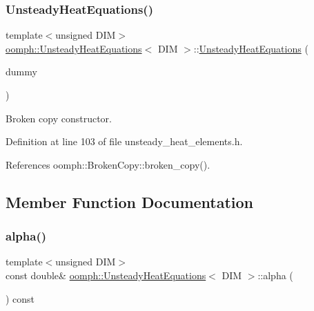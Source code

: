 \subsubsection{\texorpdfstring{Unsteady\+Heat\+Equations()}{UnsteadyHeatEquations()}\hspace{0.1cm}{\footnotesize\ttfamily [2/2]}}
{\footnotesize\ttfamily template$<$unsigned D\+IM$>$ \\
\hyperlink{classoomph_1_1UnsteadyHeatEquations}{oomph\+::\+Unsteady\+Heat\+Equations}$<$ D\+IM $>$\+::\hyperlink{classoomph_1_1UnsteadyHeatEquations}{Unsteady\+Heat\+Equations} (\begin{DoxyParamCaption}\item[{const \hyperlink{classoomph_1_1UnsteadyHeatEquations}{Unsteady\+Heat\+Equations}$<$ D\+IM $>$ \&}]{dummy }\end{DoxyParamCaption})\hspace{0.3cm}{\ttfamily [inline]}}



Broken copy constructor. 



Definition at line 103 of file unsteady\+\_\+heat\+\_\+elements.\+h.



References oomph\+::\+Broken\+Copy\+::broken\+\_\+copy().



\subsection{Member Function Documentation}
\mbox{\label{classoomph_1_1UnsteadyHeatEquations_a840e6d385ae22b44795f73fdd008fc3e}} 
\subsubsection{\texorpdfstring{alpha()}{alpha()}}
{\footnotesize\ttfamily template$<$unsigned D\+IM$>$ \\
const double\& \hyperlink{classoomph_1_1UnsteadyHeatEquations}{oomph\+::\+Unsteady\+Heat\+Equations}$<$ D\+IM $>$\+::alpha (\begin{DoxyParamCaption}{ }\end{DoxyParamCaption}) const\hspace{0.3cm}{\ttfamily [inline]}}



